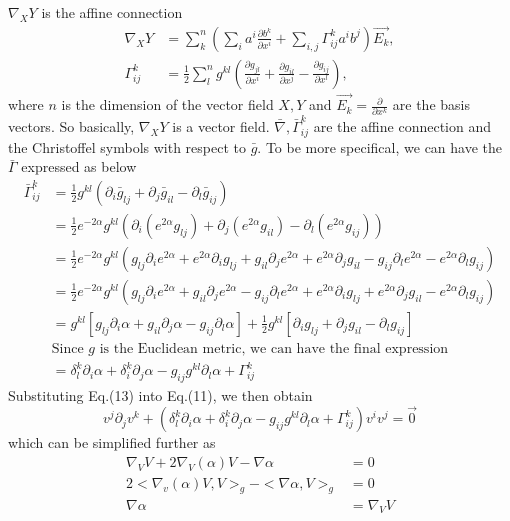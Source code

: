 \documentclass{article}
\theoremstyle{definition}
\theoremstyle{plain}
\begin{document}
$\nabla_XY$ is the affine connection
\begin{align}
    \nabla_XY&=\sum_k^n\left(\sum_i a^i\frac{\partial b^k}{\partial x^i}+\sum_{i,j}\Gamma_{ij}^k a^i b^j\right)\vec{E_k},\\ \nonumber
    \Gamma_{ij}^k&=\frac{1}{2}\sum_{l}^n  g^{kl}\left(\frac{\partial  g_{jl}}{\partial x^i}+\frac{\partial  g_{il}}{\partial x^j}-\frac{\partial  g_{ij}}{\partial x^l}\right),
\end{align}
where $n$ is the dimension of the vector field $X,Y$ and $\vec{E_k}=\frac{\partial}{\partial x^k}$ are the basis vectors. So basically, $\nabla_XY$ is a vector field. $\bar{\nabla}, \bar{\Gamma}^k_{ij}$ are the affine connection and the Christoffel symbols with respect to $\bar{g}$. To be more specifical, we can have the $\bar{\Gamma}$ expressed as below
\begin{align}
    \bar{\Gamma}^k_{ij} &= \frac12g^{kl}\left(\partial_i\bar{g}_{lj} + \partial_j\bar{g}_{il}  - \partial_l\bar{g}_{ij}\right) \\ \nonumber
	&=\frac12 e^{-2\alpha}g^{kl}(\partial_i(e^{2\alpha}g_{lj})+\partial_j(e^{2\alpha}g_{il})-\partial_l(e^{2\alpha}g_{ij}))\\ \nonumber
	&=\frac12 e^{-2\alpha}g^{kl}(g_{lj}\partial_ie^{2\alpha}+e^{2\alpha}\partial_ig_{lj}+g_{il}\partial_je^{2\alpha}+e^{2\alpha}\partial_jg_{il}-g_{ij}\partial_le^{2\alpha}-e^{2\alpha}\partial_lg_{ij})\\ \nonumber
	&=\frac12 e^{-2\alpha}g^{kl}(g_{lj}\partial_ie^{2\alpha}+g_{il}\partial_je^{2\alpha}-g_{ij}\partial_le^{2\alpha}+e^{2\alpha}\partial_ig_{lj}+e^{2\alpha}\partial_jg_{il}-e^{2\alpha}\partial_lg_{ij})\\ \nonumber
	&=g^{kl}[g_{lj}\partial_i\alpha+g_{il}\partial_j\alpha-g_{ij}\partial_l\alpha]+\frac{1}{2}g^{kl}[\partial_ig_{lj}+\partial_jg_{il}-\partial_lg_{ij}]\\ \nonumber
	&\text{Since $g$ is the Euclidean metric, we can have the final expression}\\ \nonumber
	&=\delta^k_l\partial_i\alpha+\delta^k_i\partial_j\alpha-g_{ij}g^{kl}\partial_l\alpha+\Gamma^k_{ij}
\end{align}
Substituting Eq.(13) into Eq.(11), we then obtain
\begin{equation}
    v^j\partial_jv^k+(\delta^k_l\partial_i\alpha+\delta^k_i\partial_j\alpha-g_{ij}g^{kl}\partial_l\alpha+\Gamma^k_{ij})v^iv^j=\vec{0}
\end{equation}
which can be simplified further as 
\begin{align}
    \nabla_VV+2\nabla_V(\alpha)V-\nabla\alpha&=0\\ \nonumber
    2<\nabla_v(\alpha)V,V>_g-<\nabla\alpha,V>_g&=0\\ \nonumber
    \nabla\alpha&=\nabla_VV
\end{align}
\end{document}
